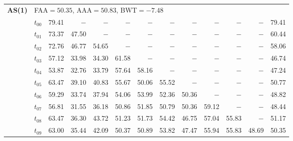 \begin{table}[ht]
\begin{tabular}{@{}l l r r r r r r r r r r r@{}}
\midrule
\multirow{11}{*}{\textbf{AS(1)}} & \multicolumn{12}{l}{\quad\small FAA$=50.35$,\; AAA$=50.83$,\; BWT$=-7.48$} \\
 & $t_{00}$ & 79.41 & $-$ & $-$ & $-$ & $-$ & $-$ & $-$ & $-$ & $-$ & $-$ & 79.41 \\
 & $t_{01}$ & 73.37 & 47.50 & $-$ & $-$ & $-$ & $-$ & $-$ & $-$ & $-$ & $-$ & 60.44 \\
 & $t_{02}$ & 72.76 & 46.77 & 54.65 & $-$ & $-$ & $-$ & $-$ & $-$ & $-$ & $-$ & 58.06 \\
 & $t_{03}$ & 57.12 & 33.98 & 34.30 & 61.58 & $-$ & $-$ & $-$ & $-$ & $-$ & $-$ & 46.74 \\
 & $t_{04}$ & 53.87 & 32.76 & 33.79 & 57.64 & 58.16 & $-$ & $-$ & $-$ & $-$ & $-$ & 47.24 \\
 & $t_{05}$ & 63.47 & 39.10 & 40.83 & 55.67 & 50.06 & 55.52 & $-$ & $-$ & $-$ & $-$ & 50.77 \\
 & $t_{06}$ & 59.29 & 33.74 & 37.94 & 54.06 & 53.99 & 52.36 & 50.36 & $-$ & $-$ & $-$ & 48.82 \\
 & $t_{07}$ & 56.81 & 31.55 & 36.18 & 50.86 & 51.85 & 50.79 & 50.36 & 59.12 & $-$ & $-$ & 48.44 \\
 & $t_{08}$ & 63.47 & 36.30 & 43.72 & 51.23 & 51.73 & 54.42 & 46.75 & 57.04 & 55.83 & $-$ & 51.17 \\
 & $t_{09}$ & 63.00 & 35.44 & 42.09 & 50.37 & 50.89 & 53.82 & 47.47 & 55.94 & 55.83 & 48.69 & 50.35 \\
\bottomrule
\end{tabular}
\end{table}

